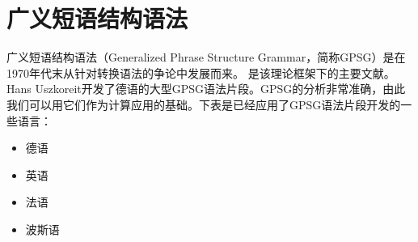 
\chapter{广义短语结构语法}
\label{Kapitel-GPSG}

广义短语结构语法（Generalized Phrase Structure Grammar，简称GPSG）是在1970年代末从针对转换语法的争论中发展而来。 \citet*{GKPS85a}是该理论框架下的主要文献。Hans Uszkoreit开发了德语的大型GPSG语法片段\citeyearpar{Uszkoreit87a}。GPSG的分析非常准确，由此我们可以用它们作为计算应用的基础。下表是已经应用了GPSG语法片段开发的一些语言：
\begin{itemize}
\item 德语 \citep{Weisweber87a-u,WP92b,Naumann87a-u,Naumann88-u-gekauft,Volk88}
\item 英语 \citep*{Evans85a-u,PT85a-u,Phillips92a-u,GCB93a-u}
\item 法语 \citep*{EdSB96a}
\item 波斯语 \citep*{BSM2011a}
\end{itemize}

